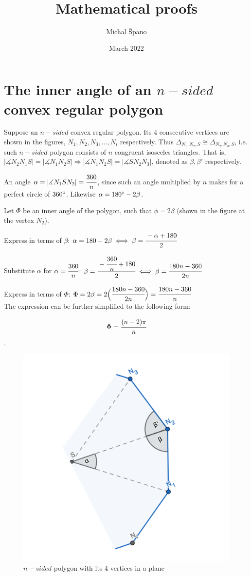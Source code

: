 \documentclass[10pt,a4paper]{article}
\title{\textbf{Mathematical proofs}}
\author{Michal Špano}
\date{March 2022}
\begin{document}
\maketitle

\section*{The inner angle of an $n-sided$ convex regular polygon}

Suppose an $n-sided$ convex regular polygon. Its 4 consecutive vertices are shown in the figures, $N_1, N_2, N_3, ..., N_i$ respectively. 
Thus $\Delta_{N_1,N_2,S} \cong \Delta_{N_2,N_3,S}$, i.e. such $n-sided$ polygon consists of $n$ congruent isosceles triangles. 
That is, $|\measuredangle N_2 N_1 S| = |\measuredangle N_1 N_2 S| \Rightarrow |\measuredangle N_1 N_2 S| = |\measuredangle S N_2 N_3|$, denoted as $\beta, \beta'$ respectively. 

An angle $\alpha = |\measuredangle N_1 S N_2| = \cfrac{360}{n}$, since such an angle multiplied by $n$ makes for a perfect circle of $360\degree$. Likewise $\alpha = 180\degree - 2 \beta$.

Let $\Phi$ be an inner angle of the polygon, such that $\phi = 2 \beta$ (shown in the figure at the vertex $N_2$).

Express in terms of $\beta$: $\alpha = 180 - 2 \beta \iff \beta = \cfrac{-\alpha + 180}{2}$

Substitute $\alpha$ for $\alpha = \cfrac{360}{n}$: $\beta = \cfrac{-\cfrac{360}{n} + 180}{2} \iff \beta = \cfrac{180n - 360}{2n}$

Express in terms of $\Phi$: $\Phi = 2 \beta = 2 \Big( \cfrac{180n - 360}{2n} \Big) = \cfrac{180n - 360}{n}$ \\

The expression can be further simplified to the following form:

$$\Phi = \cfrac{(n-2) \pi}{n}$$.

\begin{figure}[htp]
    \centering
    \includegraphics[width=4.cm]{polygon_export.png}
    \caption{$n-sided$ polygon with its 4 vertices in a plane}
\end{figure}
\end{document}
